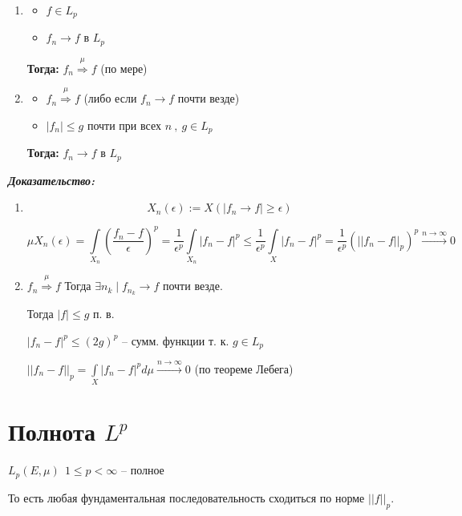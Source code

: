 \documentclass[paper=a4, fontsize=17pt]{article}
\begin{document}
\begin{enumerate}


	\item \begin{itemize}
		\item $ f \in L_p $
		\item $ f_n \rightarrow f $ в $ L_p $
	\end{itemize}
	\textbf{Тогда:} $ f_n \stackrel{\mu}{\Rightarrow} f $ (по мере)

	\item \begin{itemize}
		\item $ f_n \stackrel{\mu}{\Rightarrow} f $ (либо если $ f_n \rightarrow f $  почти везде)
		\item $ |f_n| \leq g $ почти при всех $ n ~ , ~ g \in L_p $
	\end{itemize}
	\textbf{Тогда:} $ f_n \rightarrow f $ в $ L_p $
\end{enumerate}

\textbf{\emph{Доказательство:}}

\begin{enumerate}
	\item $$ X_n(\epsilon) := X(|f_n \rightarrow f| \geq \epsilon) $$

	$$ \mu X_n(\epsilon) = \int\limits_{X_n} (\frac{f_n - f}{\epsilon})^p  =
	\frac{1}{\epsilon^p} \int\limits_{X_n} |f_n - f|^p \leq
	\frac{1}{\epsilon^p} \int\limits_{X} |f_n - f|^p =
	\frac{1}{\epsilon^p} (||f_n - f||_p)^p \stackrel{n \rightarrow \infty}{\rightarrow} 0$$

	\item $ f_n \stackrel{\mu}{\Rightarrow} f $ Тогда $ \exists n_k \mid f_{n_k} \rightarrow f $ почти везде.

	Тогда $ |f| \leq g $ п. в.

	$ |f_n - f|^p \leq (2g)^p $ -- сумм. функции т. к. $ g \in L_p $

	$ ||f_n - f||_p = \int\limits_{X} |f_n - f|^p d\mu \stackrel{n \rightarrow \infty}{\rightarrow} 0 $ (по теореме Лебега)

\end{enumerate}

\section{Полнота $L^p$}
$ L_p(E, \mu) ~ ~ 1 \leq p < \infty $ -- полное

То есть любая фундаментальная последовательность сходиться по норме $ ||f||_p $.
\end{document}
